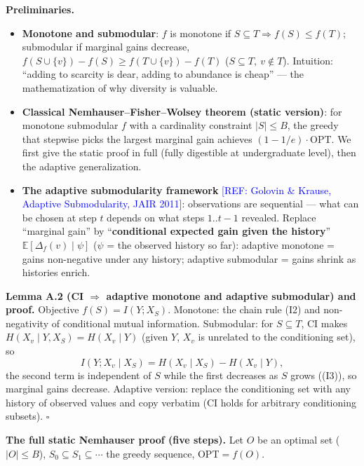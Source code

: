 \documentclass{article}
\newcommand{\refadd}[1]{\textcolor{blue}{[REF: #1]}}
\providecommand{\qed}{\hfill$\square$}
\begin{document}
\textbf{Preliminaries.}
\begin{itemize}
\item \textbf{Monotone and submodular}: $f$ is monotone if $S\subseteq T\Rightarrow f(S)\le f(T)$; submodular if marginal gains decrease, $f(S\cup\{v\})-f(S)\ge f(T\cup\{v\})-f(T)$ ($S\subseteq T,\ v\notin T$). Intuition: ``adding to scarcity is dear, adding to abundance is cheap'' --- the mathematization of why diversity is valuable.
\item \textbf{Classical Nemhauser--Fisher--Wolsey theorem (static version)}: for monotone submodular $f$ with a cardinality constraint $|S|\le B$, the greedy that stepwise picks the largest marginal gain achieves $(1-1/e)\cdot\mathrm{OPT}$. We first give the static proof in full (fully digestible at undergraduate level), then the adaptive generalization.
\item \textbf{The adaptive submodularity framework} \refadd{Golovin \& Krause, Adaptive Submodularity, JAIR 2011}: observations are sequential --- what can be chosen at step $t$ depends on what steps $1..t-1$ revealed. Replace ``marginal gain'' by ``\textbf{conditional expected gain given the history}'' $\mathbb E[\Delta_f(v)\mid\psi]$ ($\psi$ = the observed history so far): adaptive monotone = gains non-negative under any history; adaptive submodular = gains shrink as histories enrich.
\end{itemize}

\textbf{Lemma A.2 (CI $\Rightarrow$ adaptive monotone and adaptive submodular) and proof.} Objective $f(S)=I(Y;X_S)$. Monotone: the chain rule (I2) and non-negativity of conditional mutual information. Submodular: for $S\subseteq T$, CI makes $H(X_v\mid Y,X_S)=H(X_v\mid Y)$ (given $Y$, $X_v$ is unrelated to the conditioning set), so
\[
I(Y;X_v\mid X_S)=H(X_v\mid X_S)-H(X_v\mid Y),
\]
the second term is independent of $S$ while the first decreases as $S$ grows ((I3)), so marginal gains decrease. Adaptive version: replace the conditioning set with any history of observed values and copy verbatim (CI holds for arbitrary conditioning subsets). \qed{}

\textbf{The full static Nemhauser proof (five steps).} Let $O$ be an optimal set ($|O|\le B$), $S_0\subseteq S_1\subseteq\cdots$ the greedy sequence, $\mathrm{OPT}=f(O)$.
\end{document}
